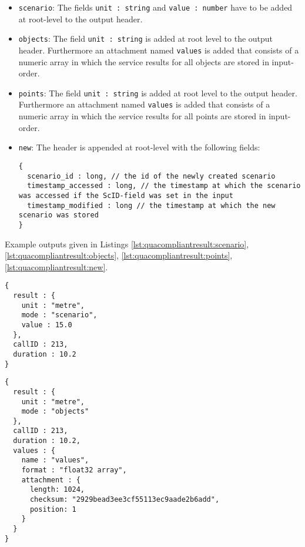 \begin{itemize}
  \item \texttt{scenario}: The fields \texttt{unit : string} and \texttt{value : number} have to be added at root-level to the output header.

  \item \texttt{objects}: The field \texttt{unit : string} is added at root level to the output header. Furthermore an attachment named \texttt{values} is added that consists of a numeric array in which the service results for all objects are stored in input-order.

  \item \texttt{points}: The field \texttt{unit : string} is added at root level to the output header. Furthermore an attachment named \texttt{values} is added that consists of a numeric array in which the service results for all points are stored in input-order.

  \item \texttt{new}: The header is appended at root-level with the following fields:
  \begin{lstlisting}
{
  scenario_id : long, // the id of the newly created scenario
  timestamp_accessed : long, // the timestamp at which the scenario was accessed if the ScID-field was set in the input
  timestamp_modified : long // the timestamp at which the new scenario was stored
}
  \end{lstlisting}
\end{itemize}

Example outputs given in Listings \ref{lst:quacompliantresult:scenario}, \ref{lst:quacompliantresult:objects}, \ref{lst:quacompliantresult:points}, \ref{lst:quacompliantresult:new}.

\begin{lstlisting}[caption={A qua-compliant service output for mode \texttt{scenario}}, label={lst:quacompliantresult:scenario}]
{
  result : {
    unit : "metre",
    mode : "scenario",
    value : 15.0
  },
  callID : 213,
  duration : 10.2
}
\end{lstlisting}

\begin{lstlisting}[caption={A qua-compliant service output for mode \texttt{objects}}, label={lst:quacompliantresult:objects}]
{
  result : {
    unit : "metre",
    mode : "objects"
  },
  callID : 213,
  duration : 10.2,
  values : {
    name : "values",
    format : "float32 array",
    attachment : {
      length: 1024,
      checksum: "2929bead3ee3cf55113ec9aade2b6add",
      position: 1
    }
  }
}
\end{lstlisting}

